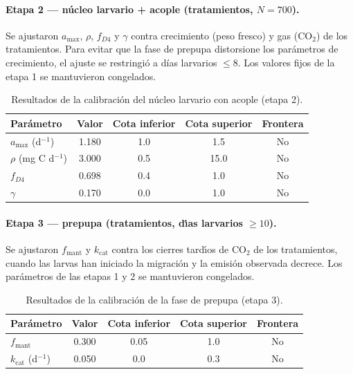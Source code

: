 \paragraph{Etapa 2 --- núcleo larvario + acople (tratamientos, $N=700$).}
Se ajustaron $a_{\max}$, $\rho$, $f_{D4}$ y $\gamma$ contra crecimiento (peso fresco) y gas (CO$_2$) de los tratamientos. Para evitar que la fase de prepupa distorsione los parámetros de crecimiento, el ajuste se restringió a días larvarios $\leq 8$. Los valores fijos de la etapa 1 se mantuvieron congelados.

\begin{table}[htbp]
  \centering
  \small
  \caption{Resultados de la calibración del núcleo larvario con acople (etapa 2).}
  \label{tab:s6-etapa2}
  \begin{tabular}{lcccc}
    \toprule
    Parámetro & Valor & Cota inferior & Cota superior & Frontera \\
    \midrule
    $a_{\max}$ (d$^{-1}$) & 1.180 & 1.0 & 1.5 & No \\
    $\rho$ (mg C d$^{-1}$) & 3.000 & 0.5 & 15.0 & No \\
    $f_{D4}$ & 0.698 & 0.4 & 1.0 & No \\
    $\gamma$ & 0.170 & 0.0 & 1.0 & No \\
    \bottomrule
  \end{tabular}
\end{table}

\paragraph{Etapa 3 --- prepupa (tratamientos, d\'{\i}as larvarios $\geq 10$).}
Se ajustaron $f_{\mathrm{mant}}$ y $k_{\mathrm{cat}}$ contra los cierres tard\'{\i}os de CO$_2$ de los tratamientos, cuando las larvas han iniciado la migraci\'{o}n y la emisi\'{o}n observada decrece. Los par\'{a}metros de las etapas 1 y 2 se mantuvieron congelados.

\begin{table}[htbp]
  \centering
  \small
  \caption{Resultados de la calibraci\'{o}n de la fase de prepupa (etapa 3).}
  \label{tab:s6-etapa3}
  \begin{tabular}{lcccc}
    \toprule
    Par\'{a}metro & Valor & Cota inferior & Cota superior & Frontera \\
    \midrule
    $f_{\mathrm{mant}}$ & 0.300 & 0.05 & 1.0 & No \\
    $k_{\mathrm{cat}}$ (d$^{-1}$) & 0.050 & 0.0 & 0.3 & No \\
    \bottomrule
  \end{tabular}
\end{table}


